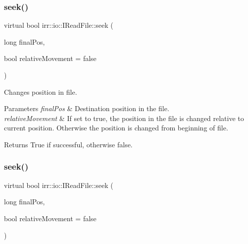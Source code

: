 \subsubsection{\texorpdfstring{seek()}{seek()}\hspace{0.1cm}{\footnotesize\ttfamily [1/2]}}
{\footnotesize\ttfamily virtual bool irr\+::io\+::\+I\+Read\+File\+::seek (\begin{DoxyParamCaption}\item[{long}]{final\+Pos,  }\item[{bool}]{relative\+Movement = {\ttfamily false} }\end{DoxyParamCaption})\hspace{0.3cm}{\ttfamily [pure virtual]}}



Changes position in file. 


\begin{DoxyParams}{Parameters}
{\em final\+Pos} & Destination position in the file. \\
\hline
{\em relative\+Movement} & If set to true, the position in the file is changed relative to current position. Otherwise the position is changed from beginning of file. \\
\hline
\end{DoxyParams}
\begin{DoxyReturn}{Returns}
True if successful, otherwise false. 
\end{DoxyReturn}
\mbox{\label{classirr_1_1io_1_1IReadFile_ac1cd81f18832e8703838d7abd495bf34}} 
\subsubsection{\texorpdfstring{seek()}{seek()}\hspace{0.1cm}{\footnotesize\ttfamily [2/2]}}
{\footnotesize\ttfamily virtual bool irr\+::io\+::\+I\+Read\+File\+::seek (\begin{DoxyParamCaption}\item[{long}]{final\+Pos,  }\item[{bool}]{relative\+Movement = {\ttfamily false} }\end{DoxyParamCaption})\hspace{0.3cm}{\ttfamily [pure virtual]}}



